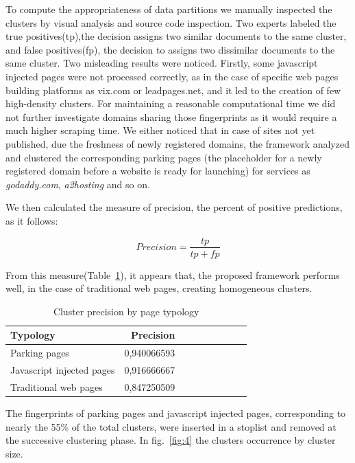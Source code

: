 \documentclass{easychair}
\begin{document}
To compute the appropriateness of data partitions we manually inspected the clusters by visual analysis and source code inspection.
Two experts labeled the true positives(tp),the decision assigns two similar documents to the same cluster, and false positives(fp), the decision to assigns two dissimilar documents to the same cluster.
Two misleading results were noticed. Firstly, some javascript injected pages were not processed correctly, as in the case of specific web pages building platforms as vix.com or leadpages.net, and it led to the creation of few high-density clusters. For maintaining a reasonable computational time we did not further investigate domains sharing those fingerprints as it would require a much higher scraping time. We either noticed that in case of sites not yet published, due the freshness of newly registered domains, the framework analyzed and clustered the corresponding parking pages (the placeholder for a newly registered domain before a website is ready for launching) for services as \textit{godaddy.com}, \textit{a2hosting}  and so on. 

We then calculated the measure of precision, the percent of positive predictions, as it follows:

\[
    Precision = \frac{tp}{tp + fp}
\]

From this measure(Table~\ref{tab:table5}), it  appears that, the proposed framework performs well, in the case of traditional web pages, creating homogeneous clusters.

\begin{table}[htp]
  \begin{centering}
    \begin{tabular}{lrrrrrrrr}
    \hline
    Typology           & Precision \\
    
    \hline
    Parking pages      &  0,940066593	   \\
       
    Javascript injected pages      &  0,916666667	   \\
    
   
    Traditional web pages      &  0,847250509   \\

    \hline
    \end{tabular}
    \caption{Cluster precision by page typology }
    \label{tab:table5}
  \end{centering}
\end{table}


The fingerprints of parking pages and javascript injected pages, corresponding to nearly the 55\% of the total clusters, were inserted in a stoplist and removed at the successive clustering phase. In fig.~\ref{fig:4} the clusters occurrence by cluster size.
\end{document}
